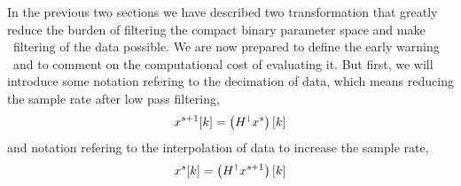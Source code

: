 In the previous two sections we have described two transformation that greatly
reduce the burden of filtering the compact binary parameter space and make \TD\
filtering of the data possible.  We are now prepared to define the early
warning \SNR\ and to comment on the computational cost of evaluating it.  But
first, we will introduce some notation refering to the decimation of data,
which means reducing the sample rate after low pass filtering,
\begin{equation}
\label{eq:decomp}
	x^{s+1}[k] = \left( H^\shortdownarrow x^s\right)[k]
\end{equation}
and notation refering to the interpolation of data to increase the sample rate,
\begin{equation}
	x^{s}[k] = \left( H^\shortuparrow x^{s+1}\right)[k]
\end{equation}

